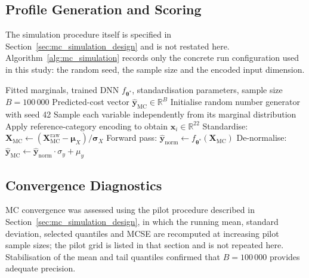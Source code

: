\subsection{Profile Generation and Scoring}
\label{annexure:mc_generate}

The simulation procedure itself is specified in Section~\ref{sec:mc_simulation_design} and is not restated here. Algorithm~\ref{alg:mc_simulation} records only the concrete run configuration used in this study: the random seed, the sample size and the encoded input dimension.

\begin{algorithm}[htbp]
\caption{Parametric MC simulation.}
\label{alg:mc_simulation}
\begin{algorithmic}[1]
\Require Fitted marginals, trained DNN $f_{\boldsymbol{\theta}^*}$, standardisation parameters, sample size $B = 100\,000$
\Ensure Predicted-cost vector $\hat{\mathbf{y}}_{\mathrm{MC}} \in \mathbb{R}^B$
\State Initialise random number generator with seed 42
    \State Sample each variable independently from its marginal distribution
    \State Apply reference-category encoding to obtain $\mathbf{x}_i \in \mathbb{R}^{22}$
\EndFor
\State Standardise: $\mathbf{X}_{\mathrm{MC}} \gets (\mathbf{X}_{\mathrm{MC}}^{\mathrm{raw}} - \boldsymbol{\mu}_X) / \boldsymbol{\sigma}_X$
\State Forward pass: $\hat{\mathbf{y}}_{\mathrm{norm}} \gets f_{\boldsymbol{\theta}^*}(\mathbf{X}_{\mathrm{MC}})$
\State De-normalise: $\hat{\mathbf{y}}_{\mathrm{MC}} \gets \hat{\mathbf{y}}_{\mathrm{norm}} \cdot \sigma_y + \mu_y$
\end{algorithmic}
\end{algorithm}

\subsection{Convergence Diagnostics}
\label{annexure:mc_convergence}

MC convergence was assessed using the pilot procedure described in Section~\ref{sec:mc_simulation_design}, in which the running mean, standard deviation, selected quantiles and MCSE are recomputed at increasing pilot sample sizes; the pilot grid is listed in that section and is not repeated here. Stabilisation of the mean and tail quantiles confirmed that $B = 100\,000$ provides adequate precision.

